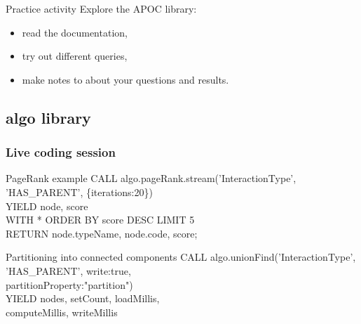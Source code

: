 \documentclass[12pt]{beamer}
\begin{document}
    \begin{frame}{Practice activity}
        Explore the APOC library:
        \begin{itemize}
            \item read the documentation,
            \item try out different queries,
            \item make notes to about your questions and results.
        \end{itemize}
    \end{frame}
    
    \subsection{algo library}
    \begin{frame}
        \frametitle{Live coding session}
        \begin{block}{PageRank example}
            CALL algo.pageRank.stream('InteractionType',\\
            \hspace{1cm} 'HAS\_PARENT', \{iterations:20\})\\
            \hspace{1cm} YIELD node, score\\
            WITH * ORDER BY score DESC LIMIT 5\\
            RETURN node.typeName, node.code, score;
        \end{block}
        \begin{block}{Partitioning into connected components}
            CALL algo.unionFind('InteractionType',\\
            \hspace{2cm} 'HAS\_PARENT', {write:true,\\
            \hspace{2cm} partitionProperty:"partition"})\\
            YIELD nodes, setCount, loadMillis,\\
            \hspace{2cm} computeMillis, writeMillis
        \end{block}
    \end{frame}
    
\end{document}
